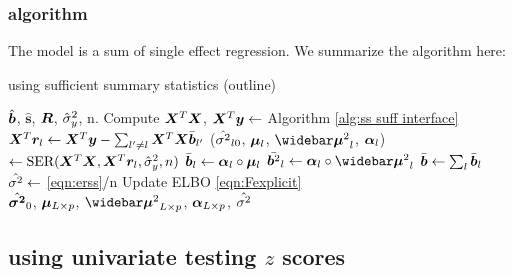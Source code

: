 \subsubsection{\susie algorithm}
The \susie model is a sum of single effect regression. We summarize the algorithm here:
\begin{algorithm}[H] 
\caption{\susie using sufficient summary statistics (outline)} \label{alg:susiealg}
\begin{algorithmic}[1]
\Require $\hat{\bm b}$, $\hat{\bm{s}}$, $\bm R$, $\hat{\sigma}_y^2$, n.
\State Compute $\bm X^T \bm X$, $\bm X^{T}\bm y \gets $ Algorithm \ref{alg:ss suff interface} 
\Repeat
{}
	\State $\bm X^{T}\bm r_l \gets \bm X^{T}\bm y - \sum_{l'\neq l} \bm X^{T}\bm X \bar{\bm b}_{l'}$ 
    \State ($\hat{\sigma^2}_{l0}$, $\bm \mu_l$, $\emusq_l$, $\bm \alpha_l$) $\gets \text{SER}(\bm X^T\bm X, \bm X^T\bm r_l,\hat{\sigma}_y^2, n)$ 
    \State $\bar{\bm b}_l \gets \bm \alpha_l \circ \bm \mu_l$ 
    \State $\bar{\vb^2}_l \gets \valpha_l \circ \emusq_l$ 
\EndFor
\State $\bar{\bm b} \gets \sum_l \bar{\bm b}_l$
\State $\hat{\sigma^2} \gets$ \eqref{eqn:erss}/n
\State Update ELBO \eqref{eqn:Fexplicit}
 \\
\Return $\hat{\bm {\sigma^2}}_0$, $\bm \mu_{L\times p}$, $\emusq_{L\times p}$, $\bm \alpha_{L\times p}$, $\hat{\sigma^2}$
\end{algorithmic}
\end{algorithm}

\subsection{\susie using univariate testing $z$ scores} \label{sec:summary z}
